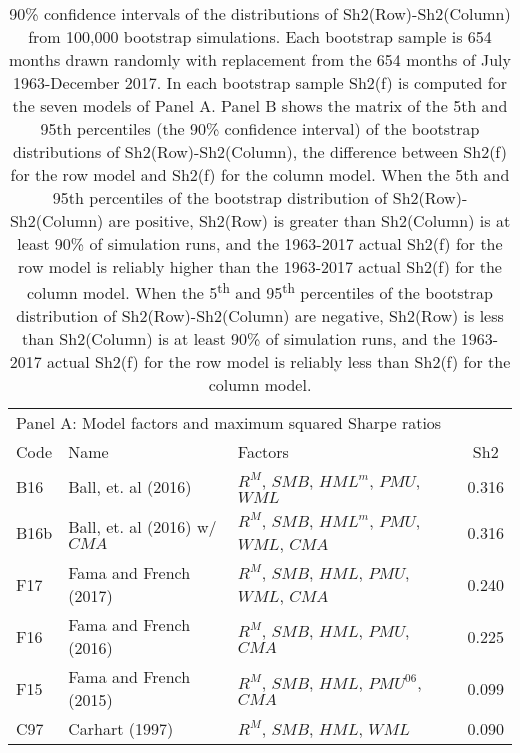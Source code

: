 
\begin{table}[!ht]
\centering
\caption{
\scriptsize{
90\% confidence intervals of the distributions of Sh2(Row)-Sh2(Column) from 100,000
bootstrap simulations. Each bootstrap sample is 654 months drawn randomly with replacement
from the 654 months of July 1963-December 2017. In each bootstrap sample Sh2(f) is
computed for the seven models of Panel A. Panel B shows the matrix of the 5th and 95th
percentiles (the 90\% confidence interval) of the bootstrap distributions of
Sh2(Row)-Sh2(Column), the difference between Sh2(f) for the row model and Sh2(f) for the
column model. When the 5th and 95th percentiles of the bootstrap distribution of
Sh2(Row)-Sh2(Column) are positive, Sh2(Row) is greater than Sh2(Column) is at least 90\%
of simulation runs, and the 1963-2017 actual Sh2(f) for the row model is reliably higher
than the 1963-2017 actual Sh2(f) for the column model. When the 5\textsuperscript{th} and
95\textsuperscript{th} percentiles of the bootstrap distribution of Sh2(Row)-Sh2(Column)
are negative, Sh2(Row) is less than Sh2(Column) is at least 90\% of simulation runs, and
the 1963-2017 actual Sh2(f) for the row model is reliably less than Sh2(f) for the column
model.
}
}
\begin{tabular}{lcccccc}
  \toprule
  \multicolumn{7}{l}{Panel A: Model factors and maximum squared Sharpe ratios} \\
  Code  & \multicolumn{2}{l}{Name}                         & \multicolumn{3}{l}{Factors}                                   & Sh2   \\
  B16   & \multicolumn{2}{l}{Ball, et. al (2016)}          & \multicolumn{3}{l}{$R^M$, $SMB$, $HML^m$, $PMU$, $WML$}        & 0.316 \\
  B16b  & \multicolumn{2}{l}{Ball, et. al (2016) w/ $CMA$} & \multicolumn{3}{l}{$R^M$, $SMB$, $HML^m$, $PMU$, $WML$, $CMA$} & 0.316 \\
  F17   & \multicolumn{2}{l}{Fama and French (2017)}       & \multicolumn{3}{l}{$R^M$, $SMB$, $HML$, $PMU$, $WML$, $CMA$}   & 0.240 \\
  F16   & \multicolumn{2}{l}{Fama and French (2016)}       & \multicolumn{3}{l}{$R^M$, $SMB$, $HML$, $PMU$, $CMA$}          & 0.225 \\
  F15   & \multicolumn{2}{l}{Fama and French (2015)}       & \multicolumn{3}{l}{$R^M$, $SMB$, $HML$, $PMU^{06}$, $CMA$}     & 0.099 \\
  C97   & \multicolumn{2}{l}{Carhart (1997)}               & \multicolumn{3}{l}{$R^M$, $SMB$, $HML$, $WML$}                 & 0.090 \\

\end{tabular}
\end{table}
